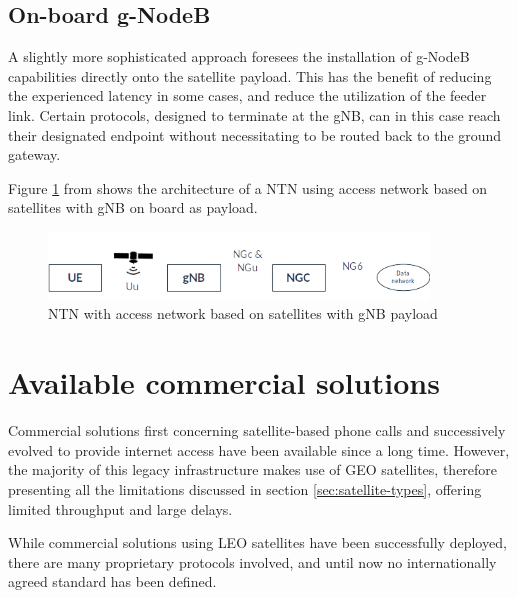 \subsection{On-board g-NodeB}
A slightly more sophisticated approach foresees the installation of g-NodeB capabilities directly onto the satellite payload. This has the benefit of reducing the experienced latency in some cases, and reduce the utilization of the feeder link. Certain protocols, designed to terminate at the \ac{gNB}, can in this case reach their designated endpoint without necessitating to be routed back to the ground gateway.

Figure \ref{fig:ntn-gnb-onboard} from \cite{3gpp-tr-38.811} shows the architecture of a \ac{NTN} using access network based on satellites with \ac{gNB} on board as payload.

\begin{figure}[ht]
    \centering
    \includegraphics[width=0.9\textwidth]{res/ntn-bent-pipe.png}
    \caption{NTN with access network based on satellites with gNB payload \cite{3gpp-tr-38.811}}
    \label{fig:ntn-gnb-onboard}
\end{figure}

\section{Available commercial solutions}
Commercial solutions first concerning satellite-based phone calls and successively evolved to provide internet access have been available since a long time. However, the majority of this legacy infrastructure makes use of \ac{GEO} satellites, therefore presenting all the limitations discussed in section \ref{sec:satellite-types}, offering limited throughput and large delays.

While commercial solutions using \ac{LEO} satellites have been successfully deployed, there are many proprietary protocols involved, and until now no internationally agreed standard has been defined. 